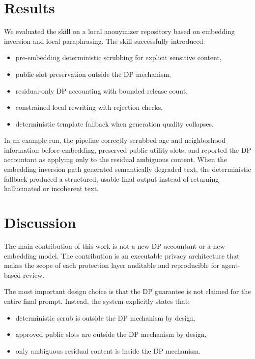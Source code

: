 \documentclass[11pt]{article}
\begin{document}
\section{Results}

We evaluated the skill on a local anonymizer repository based on embedding inversion and local paraphrasing. The skill successfully introduced:
\begin{itemize}[leftmargin=1.5em]
    \item pre-embedding deterministic scrubbing for explicit sensitive content,
    \item public-slot preservation outside the DP mechanism,
    \item residual-only DP accounting with bounded release count,
    \item constrained local rewriting with rejection checks,
    \item deterministic template fallback when generation quality collapses.
\end{itemize}

In an example run, the pipeline correctly scrubbed age and neighborhood information before embedding, preserved public utility slots, and reported the DP accountant as applying only to the residual ambiguous content. When the embedding inversion path generated semantically degraded text, the deterministic fallback produced a structured, usable final output instead of returning hallucinated or incoherent text.

\section{Discussion}

The main contribution of this work is not a new DP accountant or a new embedding model. The contribution is an executable privacy architecture that makes the scope of each protection layer auditable and reproducible for agent-based review.

The most important design choice is that the DP guarantee is not claimed for the entire final prompt. Instead, the system explicitly states that:
\begin{itemize}[leftmargin=1.5em]
    \item deterministic scrub is outside the DP mechanism by design,
    \item approved public slots are outside the DP mechanism by design,
    \item only ambiguous residual content is inside the DP mechanism.
\end{itemize}
\end{document}
